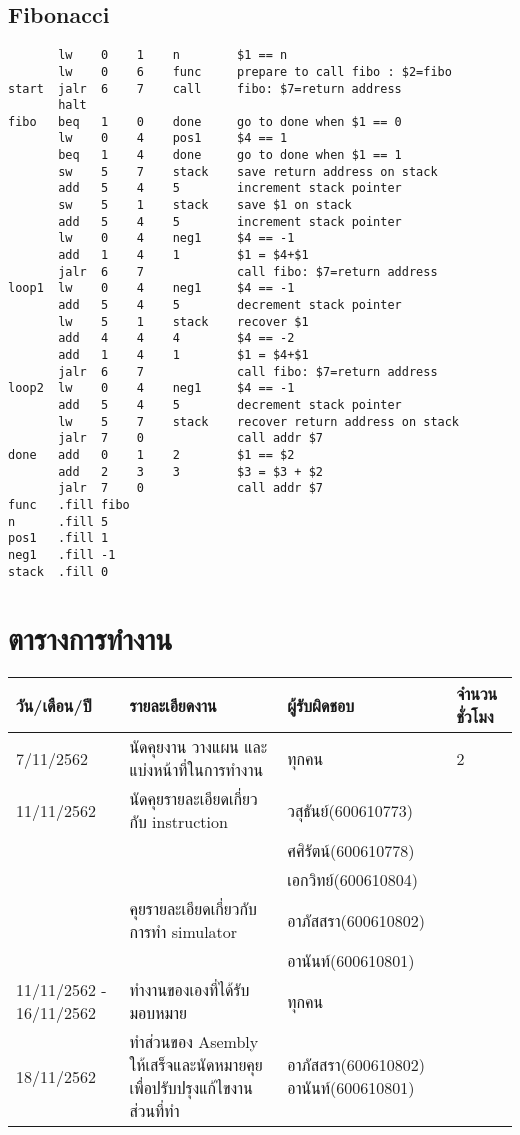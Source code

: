 \documentclass[14pt]{article}
\begin{document}
\subsection{Fibonacci}
\begin{lstlisting}
       lw    0    1    n        $1 == n     
       lw    0    6    func     prepare to call fibo : $2=fibo 
start  jalr  6    7    call     fibo: $7=return address
       halt
fibo   beq   1    0    done     go to done when $1 == 0
       lw    0    4    pos1     $4 == 1
       beq   1    4    done     go to done when $1 == 1
       sw    5    7    stack    save return address on stack
       add   5    4    5        increment stack pointer
       sw    5    1    stack    save $1 on stack
       add   5    4    5        increment stack pointer
       lw    0    4    neg1     $4 == -1
       add   1    4    1        $1 = $4+$1
       jalr  6    7             call fibo: $7=return address
loop1  lw    0    4    neg1     $4 == -1
       add   5    4    5        decrement stack pointer
       lw    5    1    stack    recover $1
       add   4    4    4        $4 == -2
       add   1    4    1        $1 = $4+$1
       jalr  6    7             call fibo: $7=return address
loop2  lw    0    4    neg1     $4 == -1
       add   5    4    5        decrement stack pointer
       lw    5    7    stack    recover return address on stack
       jalr  7    0             call addr $7
done   add   0    1    2        $1 == $2
       add   2    3    3        $3 = $3 + $2
       jalr  7    0             call addr $7
func   .fill fibo
n      .fill 5
pos1   .fill 1
neg1   .fill -1
stack  .fill 0   
\end{lstlisting}

\newpage
\vspace*{\fill}
\noindent
{}

\vfill

\newpage
\section{ตารางการทำงาน}

\begin{tabular}{ |p{2cm}|p{6cm}|p{3cm}|p{2cm}|  }
\hline
วัน/เดือน/ปี & รายละเอียดงาน &ผู้รับผิดชอบ & จำนวนชั่วโมง\\
\hline
7/11/2562 & นัดคุยงาน วางแผน และแบ่งหน้าที่ในการทำงาน  & ทุกคน & 2 \\
\hline
11/11/2562 & นัดคุยรายละเอียดเกี่ยวกับ instruction  & วสุธันย์(600610773) \\ &&ศศิรัตน์(600610778) \\ &&เอกวิทย์(600610804) \\
          & คุยรายละเอียดเกี่ยวกับการทำ simulator & อาภัสสรา(600610802)  \\ && อานันท์(600610801) \\
\hline
11/11/2562 - 16/11/2562 &ทำงานของเองที่ได้รับมอบหมาย & ทุกคน\\
\hline
18/11/2562 &ทำส่วนของ Asembly ให้เสร็จและนัดหมายคุยเพื่อปรับปรุงแก้ไขงานส่วนที่ทำ & อาภัสสรา(600610802)        อานันท์(600610801)\\
\hline
\end{tabular}
\end{document}
